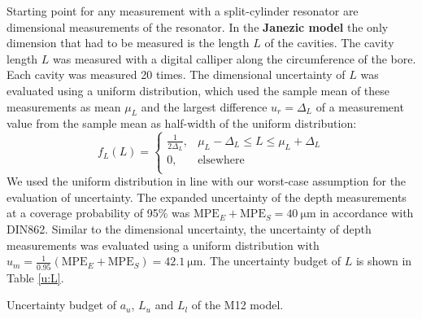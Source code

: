 Starting point for any measurement with a split-cylinder resonator are dimensional measurements of the resonator. In the \textbf{Janezic model} the only dimension that had to be measured is the length $L$ of the cavities. The cavity length $L$ was measured with a digital calliper along the circumference of the bore. Each cavity was measured 20 times. The dimensional uncertainty of $L$ was evaluated using a uniform distribution, which used the sample mean of these measurements as mean $\mu_L$ and the largest difference $u_r=\Delta_L$ of a measurement value from the sample mean as half-width of the uniform distribution:
\begin{equation}
f_L(L)=\begin{cases}\frac{1}{2\Delta_L}, & \mu_L-\Delta_L\leq L\leq \mu_L+\Delta_L\\
					0, & \text{elsewhere} \\
	    \end{cases}
\end{equation}
We used the uniform distribution in line with our worst-case assumption for the evaluation of uncertainty. The expanded uncertainty of the depth measurements at a coverage probability of 95\% was $\text{MPE}_E+\text{MPE}_S=\SI{40}{\micro\meter}$ in accordance with DIN862. Similar to the dimensional uncertainty, the uncertainty of depth measurements was evaluated using a uniform distribution with $u_m=\frac{1}{0.95}(\text{MPE}_E+\text{MPE}_S)=\SI{42.1}{\micro\meter}$. The uncertainty budget of $L$ is shown in Table \ref{u:L}.

\begin{table}[ht]
\centering

\uncertlu
{}

\vspace{7px}

\uncertll
{}

\vspace{7px}

\uncertau
{}
\caption{Uncertainty budget of $a_u$, $L_u$ and $L_l$ of the M12 model.}\label{u:Ll}
\end{table}

